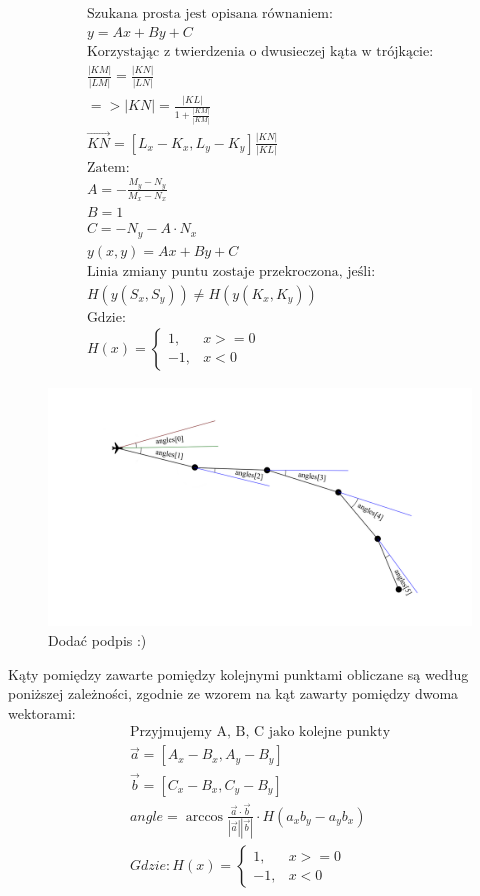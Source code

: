 \documentclass[12pt, a4paper]{article}
\begin{document}
\begin{gather*} 
	\text{Szukana prosta jest opisana równaniem:} \\ 
	y = Ax + By + C \\ 
	\text{Korzystając z twierdzenia o dwusieczej kąta w trójkącie:} \\	
	\frac{|KM|}{|LM|} = \frac{|KN|}{|LN|} \\
	=>|KN| = \frac{|KL|}{1+\frac{|KM|}{|KM|}} \\
	\vec{KN} = [L_x - K_x, L_y - K_y] \frac{|KN|}{|KL|} \\
	\text{Zatem:} \\
	A = -\frac{M_y - N_y}{M_x - N_x} \\
	B = 1 \\
	C = -N_y - A \cdot N_x \\
	y(x, y) = Ax + By + C  \\
	\text{Linia zmiany puntu zostaje przekroczona, jeśli:} \\
	H(y(S_x, S_y)) \neq  H(y(K_x, K_y)) \\
	\text{Gdzie:} \\
	H(x) = \begin{cases} 1, & x >= 0 \\ -1, & x < 0 \end{cases}	 
\end{gather*}
 \begin{figure}[ht]
    \centering
    \includegraphics[width=1\textwidth]{angles}
    \caption{Dodać podpis :)}
\end{figure}
Kąty pomiędzy zawarte pomiędzy kolejnymi punktami obliczane są według poniższej zależności, zgodnie ze wzorem na kąt zawarty pomiędzy dwoma wektorami:
\begin{gather*} 
	\text{Przyjmujemy A, B, C jako kolejne punkty} \\ 
 	\vec{a} = [A_x - B_x, A_y - B_y] \\
 	\vec{b} = [C_x - B_x, C_y - B_y] \\
 	angle = 	\arccos{\frac{\vec{a} \cdot \vec{b}}{|\vec{a}||\vec{b}|} } \cdot H(a_x b_y -  a_y b_x) \\ 
 	Gdzie:
 	H(x) = \begin{cases} 1, & x >= 0 \\ -1, & x < 0 \end{cases}\\
\end{gather*}
\end{document}
